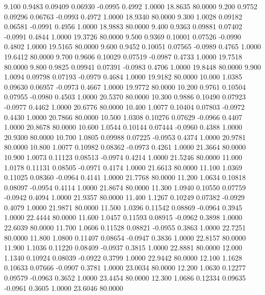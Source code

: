    9.100   0.9483   0.09409   0.06930  -0.0995   0.4992   1.0000  18.8635  80.0000
   9.200   0.9752   0.09296   0.06763  -0.0993   0.4972   1.0000  18.9340  80.0000
   9.300   1.0028   0.09182   0.06581  -0.0991   0.4956   1.0000  18.9883  80.0000
   9.400   0.9363   0.09881   0.07402  -0.0991   0.4844   1.0000  19.3726  80.0000
   9.500   0.9369   0.10001   0.07526  -0.0990   0.4802   1.0000  19.5165  80.0000
   9.600   0.9452   0.10051   0.07565  -0.0989   0.4765   1.0000  19.6412  80.0000
   9.700   0.9606   0.10029   0.07519  -0.0987   0.4733   1.0000  19.7518  80.0000
   9.800   0.9825   0.09941   0.07391  -0.0983   0.4706   1.0000  19.8448  80.0000
   9.900   1.0094   0.09798   0.07193  -0.0979   0.4684   1.0000  19.9182  80.0000
  10.000   1.0385   0.09630   0.06957  -0.0973   0.4667   1.0000  19.9772  80.0000
  10.200   0.9761   0.10504   0.07955  -0.0980   0.4503   1.0000  20.5370  80.0000
  10.300   0.9886   0.10490   0.07923  -0.0977   0.4462   1.0000  20.6776  80.0000
  10.400   1.0077   0.10404   0.07803  -0.0972   0.4430   1.0000  20.7866  80.0000
  10.500   1.0308   0.10276   0.07629  -0.0966   0.4407   1.0000  20.8678  80.0000
  10.600   1.0544   0.10144   0.07444  -0.0960   0.4388   1.0000  20.9300  80.0000
  10.700   1.0805   0.09988   0.07225  -0.0953   0.4374   1.0000  20.9781  80.0000
  10.800   1.0077   0.10982   0.08362  -0.0973   0.4261   1.0000  21.3664  80.0000
  10.900   1.0073   0.11123   0.08513  -0.0974   0.4214   1.0000  21.5246  80.0000
  11.000   1.0178   0.11131   0.08505  -0.0971   0.4174   1.0000  21.6613  80.0000
  11.100   1.0369   0.11025   0.08360  -0.0964   0.4141   1.0000  21.7768  80.0000
  11.200   1.0634   0.10818   0.08097  -0.0954   0.4114   1.0000  21.8674  80.0000
  11.300   1.0940   0.10550   0.07759  -0.0942   0.4094   1.0000  21.9357  80.0000
  11.400   1.1267   0.10249   0.07382  -0.0929   0.4079   1.0000  21.9871  80.0000
  11.500   1.0396   0.11542   0.08869  -0.0964   0.3945   1.0000  22.4444  80.0000
  11.600   1.0457   0.11593   0.08915  -0.0962   0.3898   1.0000  22.6039  80.0000
  11.700   1.0606   0.11528   0.08821  -0.0955   0.3863   1.0000  22.7251  80.0000
  11.800   1.0800   0.11407   0.08654  -0.0947   0.3836   1.0000  22.8157  80.0000
  11.900   1.1036   0.11220   0.08409  -0.0937   0.3815   1.0000  22.8881  80.0000
  12.000   1.1340   0.10924   0.08039  -0.0922   0.3799   1.0000  22.9442  80.0000
  12.100   1.1628   0.10633   0.07666  -0.0907   0.3781   1.0000  23.0034  80.0000
  12.200   1.0630   0.12277   0.09579  -0.0963   0.3652   1.0000  23.4454  80.0000
  12.300   1.0686   0.12334   0.09635  -0.0961   0.3605   1.0000  23.6046  80.0000
